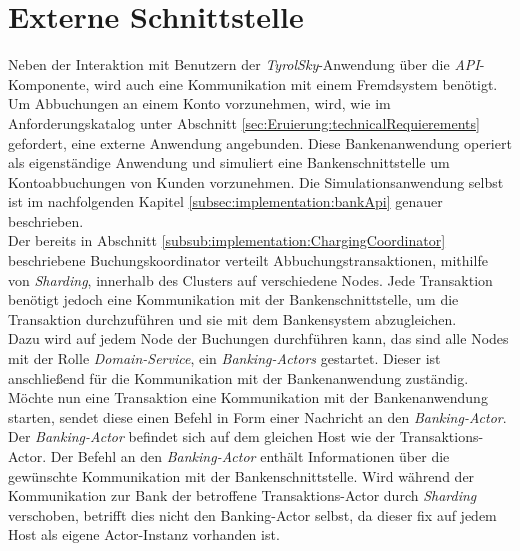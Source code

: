 \section{Externe Schnittstelle}
\label{sec:implementation:externalApi}
Neben der Interaktion mit Benutzern der \textit{TyrolSky}-Anwendung über die \textit{API}-Komponente, wird auch eine Kommunikation mit einem Fremdsystem benötigt. Um Abbuchungen an einem Konto vorzunehmen, wird, wie im Anforderungskatalog unter Abschnitt \ref{sec:Eruierung:technicalRequierements} gefordert, eine externe Anwendung angebunden. Diese Bankenanwendung operiert als eigenständige Anwendung und simuliert eine Bankenschnittstelle um Kontoabbuchungen von Kunden vorzunehmen. Die Simulationsanwendung selbst ist im nachfolgenden Kapitel \ref{subsec:implementation:bankApi} genauer beschrieben. \\
Der bereits in Abschnitt \ref{subsub:implementation:ChargingCoordinator} beschriebene Buchungskoordinator verteilt Abbuchungstransaktionen, mithilfe von \textit{Sharding}, innerhalb des Clusters auf verschiedene Nodes. Jede Transaktion benötigt jedoch eine Kommunikation mit der Bankenschnittstelle, um die Transaktion durchzuführen und sie mit dem Bankensystem abzugleichen. \\
Dazu wird auf jedem Node der Buchungen durchführen kann, das sind alle Nodes mit der Rolle \textit{Domain-Service}, ein \textit{Banking-Actors} gestartet. Dieser ist anschließend für die Kommunikation mit der Bankenanwendung zuständig. \\
Möchte nun eine Transaktion eine Kommunikation mit der Bankenanwendung starten, sendet diese einen Befehl in Form einer Nachricht an den \textit{Banking-Actor}. Der \textit{Banking-Actor} befindet sich auf dem gleichen Host wie der Transaktions-Actor. Der Befehl an den \textit{Banking-Actor} enthält Informationen über die gewünschte Kommunikation mit der Bankenschnittstelle. Wird während der Kommunikation zur Bank der betroffene Transaktions-Actor durch \textit{Sharding} verschoben, betrifft dies nicht den Banking-Actor selbst, da dieser fix auf jedem Host als eigene Actor-Instanz vorhanden ist. 
